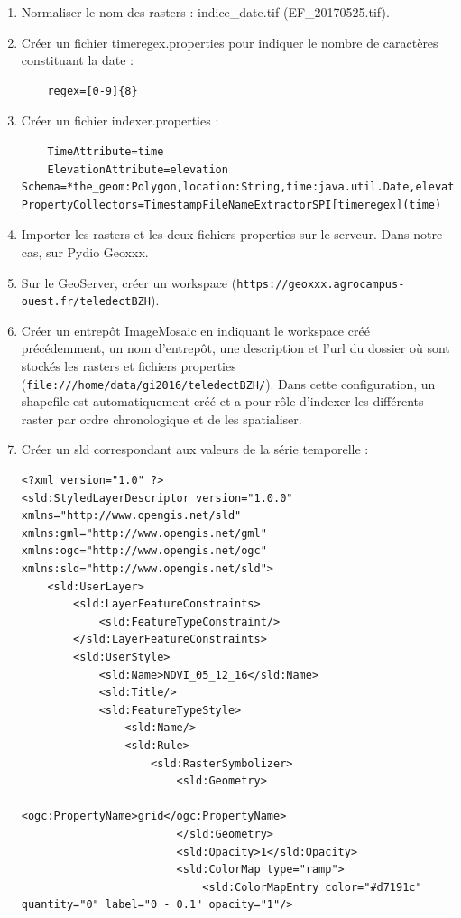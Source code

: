 \documentclass[10pt,a4paper]{article}
\begin{document}
\begin{enumerate}
\item Normaliser le nom des rasters : indice\_date.tif (EF\_20170525.tif).
\item Créer un fichier timeregex.properties pour indiquer le nombre de caractères constituant la date :
\begin{verbatim}
	regex=[0-9]{8}
\end{verbatim}
\item Créer un fichier indexer.properties :
\begin{verbatim}
	TimeAttribute=time
	ElevationAttribute=elevation
Schema=*the_geom:Polygon,location:String,time:java.util.Date,elevation:Integer
PropertyCollectors=TimestampFileNameExtractorSPI[timeregex](time)
\end{verbatim}
\item Importer les rasters et les deux fichiers properties sur le serveur. Dans notre cas, sur Pydio Geoxxx.
\item Sur le GeoServer, créer un workspace (\verb!https://geoxxx.agrocampus-ouest.fr/teledectBZH!).
\item Créer un entrepôt ImageMosaic en indiquant le workspace créé précédemment, un nom d'entrepôt, une description et l'url du dossier où sont stockés les rasters et fichiers properties (\verb!file:///home/data/gi2016/teledectBZH/!). Dans cette configuration, un shapefile est automatiquement créé et a pour rôle d'indexer les différents raster par ordre chronologique et de les spatialiser.
\item Créer un sld correspondant aux valeurs de la série temporelle :
\begin{verbatim}
<?xml version="1.0" ?>
<sld:StyledLayerDescriptor version="1.0.0" xmlns="http://www.opengis.net/sld" xmlns:gml="http://www.opengis.net/gml" xmlns:ogc="http://www.opengis.net/ogc" xmlns:sld="http://www.opengis.net/sld">
    <sld:UserLayer>
        <sld:LayerFeatureConstraints>
            <sld:FeatureTypeConstraint/>
        </sld:LayerFeatureConstraints>
        <sld:UserStyle>
            <sld:Name>NDVI_05_12_16</sld:Name>
            <sld:Title/>
            <sld:FeatureTypeStyle>
                <sld:Name/>
                <sld:Rule>
                    <sld:RasterSymbolizer>
                        <sld:Geometry>
                            <ogc:PropertyName>grid</ogc:PropertyName>
                        </sld:Geometry>
                        <sld:Opacity>1</sld:Opacity>
                        <sld:ColorMap type="ramp">
                            <sld:ColorMapEntry color="#d7191c" quantity="0" label="0 - 0.1" opacity="1"/>

\end{verbatim}
\end{enumerate}
\end{document}
